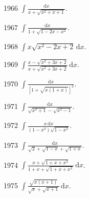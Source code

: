 
\begin{prob}[S]{1966}
$\displaystyle \int \frac{\mathrm{d}x}{x + \sqrt{x^2 + x + 1}}$.
\end{prob}

\begin{prob}[S]{1967}
$\displaystyle \int \frac{\mathrm{d}x}{1 + \sqrt{1 - 2x - x^2}}$.
\end{prob}

\begin{prob}[S]{1968}
$\displaystyle \int x\sqrt{x^2 - 2x + 2}\,\mathrm{d}x$.
\end{prob}

\begin{prob}[S]{1969}
$\displaystyle \int \frac{x - \sqrt{x^2 + 3x + 2}}{x + \sqrt{x^2 + 3x + 2}}\,\mathrm{d}x$.
\end{prob}

\begin{prob}[S]{1970}
$\displaystyle \int \frac{\mathrm{d}x}{\left[1 + \sqrt{x(1 + x)}\right]^2}$.
\end{prob}


\begin{prob}[S]{1971}
$\displaystyle \int \frac{\mathrm{d}x}{\sqrt{x^2 + 1} - \sqrt{x^2 - 1}}$.
\end{prob}

\begin{prob}[S]{1972}
$\displaystyle \int \frac{x\,\mathrm{d}x}{(1 - x^3)\sqrt{1 - x^2}}$.
\end{prob}

\begin{prob}[S]{1973}
$\displaystyle \int \frac{\mathrm{d}x}{\sqrt{2} + \sqrt{1 - x} + \sqrt{1 + x}}$.
\end{prob}

\begin{prob}[S]{1974}
$\displaystyle \int \frac{x + \sqrt{1 + x + x^2}}{1 + x + \sqrt{1 + x + x^2}}\,\mathrm{d}x$.
\end{prob}

\begin{prob}[S]{1975}
$\displaystyle \int \frac{\sqrt{x(x + 1)}}{\sqrt{x} + \sqrt{x + 1}}\,\mathrm{d}x$.
\end{prob}

